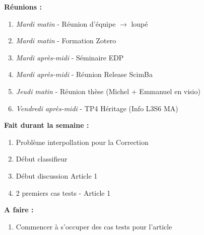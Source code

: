 \textbf{Réunions :}
\begin{enumerate}[label=\textbullet]
	\item \textit{Mardi matin} - Réunion d'équipe $\rightarrow$ loupé
	\item \textit{Mardi matin} - Formation Zotero
	\item \textit{Mardi après-midi} - Séminaire EDP
	\item \textit{Mardi après-midi} - Réunion Release ScimBa
	\item \textit{Jeudi matin} - Réunion thèse (Michel + Emmanuel en visio)
	\item \textit{Vendredi après-midi} - TP4 Héritage (Info L3S6 MA)
\end{enumerate}
\textbf{Fait durant la semaine :}
\begin{enumerate}[label=\textbullet]
	\item Problème interpollation pour la Correction
	\item Début classifieur
	\item Début discussion Article 1
	\item 2 premiers cas tests - Article 1
\end{enumerate}
\textbf{A faire :}
\begin{enumerate}[label=\textbullet]
	\item Commencer à s'occuper des cas tests pour l'article
\end{enumerate}